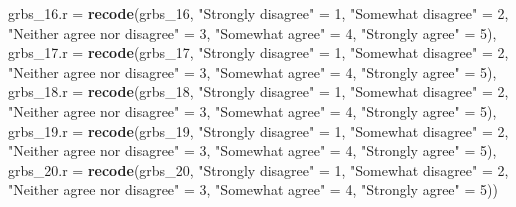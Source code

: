 \documentclass[
]{article}
\newenvironment{Shaded}{\begin{snugshade}}{\end{snugshade}}
\newcommand{\DataTypeTok}[1]{\textcolor[rgb]{0.13,0.29,0.53}{#1}}
\newcommand{\DecValTok}[1]{\textcolor[rgb]{0.00,0.00,0.81}{#1}}
\newcommand{\KeywordTok}[1]{\textcolor[rgb]{0.13,0.29,0.53}{\textbf{#1}}}
\newcommand{\NormalTok}[1]{#1}
\newcommand{\StringTok}[1]{\textcolor[rgb]{0.31,0.60,0.02}{#1}}
\begin{document}
\begin{Shaded}
\begin{Highlighting}[]
         \DataTypeTok{grbs\_16.r =} \KeywordTok{recode}\NormalTok{(grbs\_}\DecValTok{16}\NormalTok{,  }\StringTok{"Strongly disagree"}\NormalTok{ =}\StringTok{ }\DecValTok{1}\NormalTok{, }\StringTok{"Somewhat disagree"}\NormalTok{ =}\StringTok{ }\DecValTok{2}\NormalTok{, }\StringTok{"Neither agree nor disagree"}\NormalTok{ =}\StringTok{ }\DecValTok{3}\NormalTok{, }\StringTok{"Somewhat agree"}\NormalTok{ =}\StringTok{ }\DecValTok{4}\NormalTok{, }\StringTok{"Strongly agree"}\NormalTok{ =}\StringTok{ }\DecValTok{5}\NormalTok{),}
          \DataTypeTok{grbs\_17.r =} \KeywordTok{recode}\NormalTok{(grbs\_}\DecValTok{17}\NormalTok{,  }\StringTok{"Strongly disagree"}\NormalTok{ =}\StringTok{ }\DecValTok{1}\NormalTok{, }\StringTok{"Somewhat disagree"}\NormalTok{ =}\StringTok{ }\DecValTok{2}\NormalTok{, }\StringTok{"Neither agree nor disagree"}\NormalTok{ =}\StringTok{ }\DecValTok{3}\NormalTok{, }\StringTok{"Somewhat agree"}\NormalTok{ =}\StringTok{ }\DecValTok{4}\NormalTok{, }\StringTok{"Strongly agree"}\NormalTok{ =}\StringTok{ }\DecValTok{5}\NormalTok{),}
         \DataTypeTok{grbs\_18.r =} \KeywordTok{recode}\NormalTok{(grbs\_}\DecValTok{18}\NormalTok{,  }\StringTok{"Strongly disagree"}\NormalTok{ =}\StringTok{ }\DecValTok{1}\NormalTok{, }\StringTok{"Somewhat disagree"}\NormalTok{ =}\StringTok{ }\DecValTok{2}\NormalTok{, }\StringTok{"Neither agree nor disagree"}\NormalTok{ =}\StringTok{ }\DecValTok{3}\NormalTok{, }\StringTok{"Somewhat agree"}\NormalTok{ =}\StringTok{ }\DecValTok{4}\NormalTok{, }\StringTok{"Strongly agree"}\NormalTok{ =}\StringTok{ }\DecValTok{5}\NormalTok{),}
         \DataTypeTok{grbs\_19.r =} \KeywordTok{recode}\NormalTok{(grbs\_}\DecValTok{19}\NormalTok{,  }\StringTok{"Strongly disagree"}\NormalTok{ =}\StringTok{ }\DecValTok{1}\NormalTok{, }\StringTok{"Somewhat disagree"}\NormalTok{ =}\StringTok{ }\DecValTok{2}\NormalTok{, }\StringTok{"Neither agree nor disagree"}\NormalTok{ =}\StringTok{ }\DecValTok{3}\NormalTok{, }\StringTok{"Somewhat agree"}\NormalTok{ =}\StringTok{ }\DecValTok{4}\NormalTok{, }\StringTok{"Strongly agree"}\NormalTok{ =}\StringTok{ }\DecValTok{5}\NormalTok{),}
         \DataTypeTok{grbs\_20.r =} \KeywordTok{recode}\NormalTok{(grbs\_}\DecValTok{20}\NormalTok{,  }\StringTok{"Strongly disagree"}\NormalTok{ =}\StringTok{ }\DecValTok{1}\NormalTok{, }\StringTok{"Somewhat disagree"}\NormalTok{ =}\StringTok{ }\DecValTok{2}\NormalTok{, }\StringTok{"Neither agree nor disagree"}\NormalTok{ =}\StringTok{ }\DecValTok{3}\NormalTok{, }\StringTok{"Somewhat agree"}\NormalTok{ =}\StringTok{ }\DecValTok{4}\NormalTok{, }\StringTok{"Strongly agree"}\NormalTok{ =}\StringTok{ }\DecValTok{5}\NormalTok{))}


\end{Highlighting}
\end{Shaded}
\end{document}
